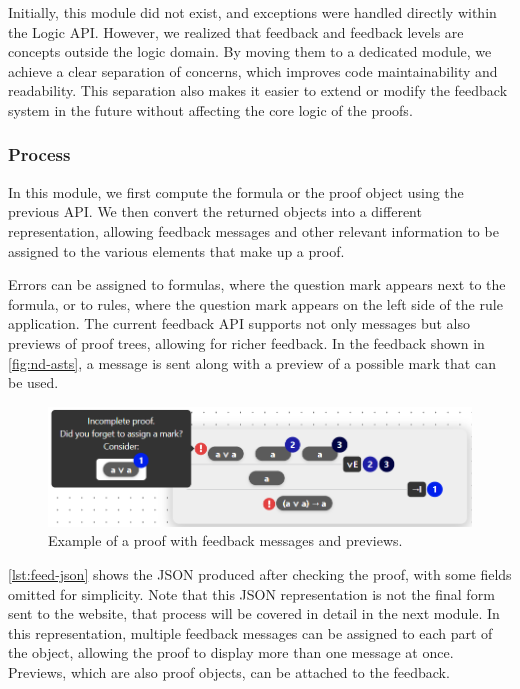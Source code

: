 Initially, this module did not exist, and exceptions were handled directly within the Logic API. However, we realized that feedback and feedback levels are concepts outside the logic domain. By moving them to a dedicated module, we achieve a clear separation of concerns, which improves code maintainability and readability. This separation also makes it easier to extend or modify the feedback system in the future without affecting the core logic of the proofs.

\subsubsection{Process}
In this module, we first compute the formula or the proof object using the previous API. We then convert the returned objects into a different representation, allowing feedback messages and other relevant information to be assigned to the various elements that make up a proof.

Errors can be assigned to formulas, where the question mark appears next to the formula, or to rules, where the question mark appears on the left side of the rule application. The current feedback API supports not only messages but also previews of proof trees, allowing for richer feedback. In the feedback shown in \autoref{fig:nd-asts}, a message is sent along with a preview of a possible mark that can be used.

\begin{figure}
    \centering
    \includegraphics[width=0.75\linewidth]{Chapters/Figures/feed-error.png}
    \caption{Example of a proof with feedback messages and previews.}
    \label{fig:nd-asts}
\end{figure}

\autoref{lst:feed-json} shows the JSON produced after checking the proof, with some fields omitted for simplicity. Note that this JSON representation is not the final form sent to the website, that process will be covered in detail in the next module. In this representation, multiple feedback messages can be assigned to each part of the object, allowing the proof to display more than one message at once. Previews, which are also proof objects, can be attached to the feedback.

